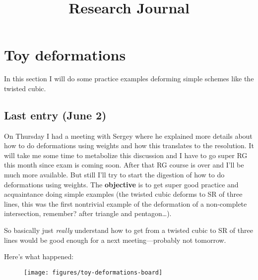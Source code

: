 



\title{Research Journal}
\maketitle

\label{section-phantom}

\tableofcontents


\section{Toy deformations}
\label{section-toy-deformations}

In this section I will do some practice examples deforming simple schemes like
the twisted cubic.

\subsection{Last entry (June 2)}
\label{subsection-june-2}

On Thursday I had a meeting with Sergey where he explained more details about
how to do deformations using weights and how this translates to the resolution.
It will take me some time to metabolize this discussion and I have to go super
RG this month since exam is coming soon. After that RG course is over and I'll
be much more available. But still I'll try to start the digestion of how to do
deformations using weights. The \textbf{objective} is to get super good practice
and acquaintance doing simple examples (the twisted cubic deforms to SR of three
lines, this was the first nontrivial example of the deformation of a
non-complete intersection, remember? after triangle and pentagon…).

So basically just \textit{really} understand how to get from a twisted cubic to
SR of three lines would be good enough for a next meeting---probably not
tomorrow.

Here's what happened:
\begin{figure}[H]
\centering
\texttt{[image: figures/toy-deformations-board]}
\caption{}
\label{figure-toy-deformations-board}
\end{figure}


